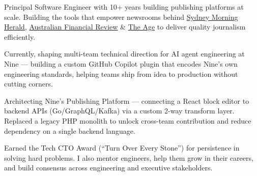 

\begin{cvparagraph}
Principal Software Engineer with 10+ years building publishing platforms at scale.
Building the tools that empower newsrooms behind
\href{https://www.smh.com.au/}{\color{awesome}Sydney Morning Herald},
\href{https://www.afr.com/}{\color{awesome}Australian Financial Review} \&
\href{https://www.theage.com.au/}{\color{awesome}The Age}
to deliver quality journalism efficiently.

Currently, shaping multi-team technical direction for AI agent engineering at
Nine --- building a custom GitHub Copilot plugin that encodes Nine's own engineering
standards, helping teams ship from idea to production without cutting corners.

Architecting Nine's Publishing Platform --- connecting a React block editor to
backend APIs (Go/GraphQL/Kafka) via a custom 2-way transform layer. Replaced a legacy
PHP monolith to unlock cross-team contribution and reduce dependency on a single
backend language.

Earned the Tech CTO Award (``Turn Over Every Stone'') for persistence in solving hard
problems. I also mentor engineers, help them grow in their careers, and build consensus
across engineering and executive stakeholders.
\end{cvparagraph}
